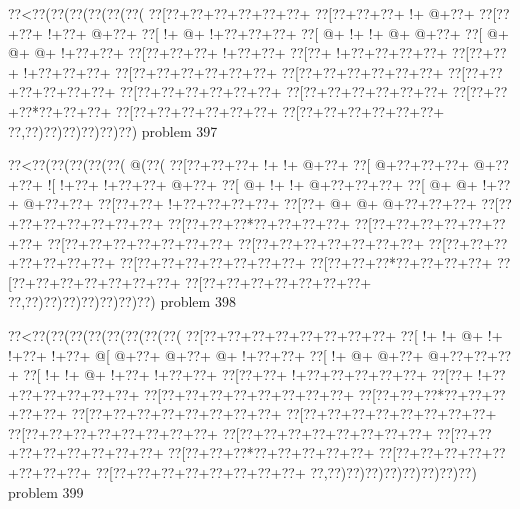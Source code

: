 \vbox{\vbox{\goo
\0??<\0??(\0??(\0??(\0??(\0??(\0??(
\0??[\0??+\0??+\0??+\0??+\0??+\0??+
\0??[\0??+\0??+\0??+\- !+\- @+\0??+
\0??[\0??+\0??+\- !+\0??+\- @+\0??+
\0??[\- !+\- @+\- !+\0??+\0??+\0??+
\0??[\- @+\- !+\- !+\- @+\- @+\0??+
\0??[\- @+\- @+\- @+\- !+\0??+\0??+
\0??[\0??+\0??+\0??+\- !+\0??+\0??+
\0??[\0??+\- !+\0??+\0??+\0??+\0??+
\0??[\0??+\0??+\- !+\0??+\0??+\0??+
\0??[\0??+\0??+\0??+\0??+\0??+\0??+
\0??[\0??+\0??+\0??+\0??+\0??+\0??+
\0??[\0??+\0??+\0??+\0??+\0??+\0??+
\0??[\0??+\0??+\0??+\0??+\0??+\0??+
\0??[\0??+\0??+\0??+\0??+\0??+\0??+
\0??[\0??+\0??+\0??*\0??+\0??+\0??+
\0??[\0??+\0??+\0??+\0??+\0??+\0??+
\0??[\0??+\0??+\0??+\0??+\0??+\0??+
\0??,\0??)\0??)\0??)\0??)\0??)\0??)
}
\hfil problem 397\hfil\break
}

\vbox{\vbox{\goo
\0??<\0??(\0??(\0??(\0??(\0??(\- @(\0??(
\0??[\0??+\0??+\0??+\- !+\- !+\- @+\0??+
\0??[\- @+\0??+\0??+\0??+\- @+\0??+\0??+
\- ![\- !+\0??+\- !+\0??+\0??+\- @+\0??+
\0??[\- @+\- !+\- !+\- @+\0??+\0??+\0??+
\0??[\- @+\- @+\- !+\0??+\- @+\0??+\0??+
\0??[\0??+\0??+\- !+\0??+\0??+\0??+\0??+
\0??[\0??+\- @+\- @+\- @+\0??+\0??+\0??+
\0??[\0??+\0??+\0??+\0??+\0??+\0??+\0??+
\0??[\0??+\0??+\0??*\0??+\0??+\0??+\0??+
\0??[\0??+\0??+\0??+\0??+\0??+\0??+\0??+
\0??[\0??+\0??+\0??+\0??+\0??+\0??+\0??+
\0??[\0??+\0??+\0??+\0??+\0??+\0??+\0??+
\0??[\0??+\0??+\0??+\0??+\0??+\0??+\0??+
\0??[\0??+\0??+\0??+\0??+\0??+\0??+\0??+
\0??[\0??+\0??+\0??*\0??+\0??+\0??+\0??+
\0??[\0??+\0??+\0??+\0??+\0??+\0??+\0??+
\0??[\0??+\0??+\0??+\0??+\0??+\0??+\0??+
\0??,\0??)\0??)\0??)\0??)\0??)\0??)\0??)
}
\hfil problem 398\hfil\break
}

\vbox{\vbox{\goo
\0??<\0??(\0??(\0??(\0??(\0??(\0??(\0??(\0??(
\0??[\0??+\0??+\0??+\0??+\0??+\0??+\0??+\0??+
\0??[\- !+\- !+\- @+\- !+\- !+\0??+\- !+\0??+
\- @[\- @+\0??+\- @+\0??+\- @+\- !+\0??+\0??+
\0??[\- !+\- @+\- @+\0??+\- @+\0??+\0??+\0??+
\0??[\- !+\- !+\- @+\- !+\0??+\- !+\0??+\0??+
\0??[\0??+\0??+\- !+\0??+\0??+\0??+\0??+\0??+
\0??[\0??+\- !+\0??+\0??+\0??+\0??+\0??+\0??+
\0??[\0??+\0??+\0??+\0??+\0??+\0??+\0??+\0??+
\0??[\0??+\0??+\0??*\0??+\0??+\0??+\0??+\0??+
\0??[\0??+\0??+\0??+\0??+\0??+\0??+\0??+\0??+
\0??[\0??+\0??+\0??+\0??+\0??+\0??+\0??+\0??+
\0??[\0??+\0??+\0??+\0??+\0??+\0??+\0??+\0??+
\0??[\0??+\0??+\0??+\0??+\0??+\0??+\0??+\0??+
\0??[\0??+\0??+\0??+\0??+\0??+\0??+\0??+\0??+
\0??[\0??+\0??+\0??*\0??+\0??+\0??+\0??+\0??+
\0??[\0??+\0??+\0??+\0??+\0??+\0??+\0??+\0??+
\0??[\0??+\0??+\0??+\0??+\0??+\0??+\0??+\0??+
\0??,\0??)\0??)\0??)\0??)\0??)\0??)\0??)\0??)
}
\hfil problem 399\hfil\break
}

